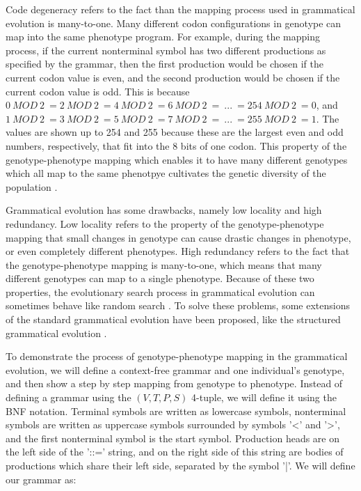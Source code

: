 Code degeneracy refers to the fact than the mapping process used in grammatical evolution is many-to-one. Many different codon configurations in genotype can map into the same phenotype program. For example, during the mapping process, if the current nonterminal symbol has two different productions as specified by the grammar, then the first production would be chosen if the current codon value is even, and the second production would be chosen if the current codon value is odd. This is because $0\:MOD\:2\:=2\:MOD\:2\:=4\:MOD\:2\:=6\:MOD\:2\:=\:...\:=254\:MOD\:2\:=0$, and $1\:MOD\:2\:=3\:MOD\:2\:=5\:MOD\:2\:=7\:MOD\:2\:=\:...\:=255\:MOD\:2\:=1$. The values are shown up to 254 and 255 because these are the largest even and odd numbers, respectively, that fit into the 8 bits of one codon. This property of the genotype-phenotype mapping which enables it to have many different genotypes which all map to the same phenotpye cultivates the genetic diversity of the population \citep{neill2003grammaticalevolution}.

Grammatical evolution has some drawbacks, namely low locality and high redundancy. Low locality refers to the property of the genotype-phenotype mapping that small changes in genotype can cause drastic changes in phenotype, or even completely different phenotypes. High redundancy refers to the fact that the genotype-phenotype mapping is many-to-one, which means that many different genotypes can map to a single phenotype. Because of these two properties, the evolutionary search process in grammatical evolution can sometimes behave like random search \citep{megane2022coevolutionary}. To solve these problems, some extensions of the standard grammatical evolution have been proposed, like the structured grammatical evolution \citep{lourenco2018structured}.

To demonstrate the process of genotype-phenotype mapping in the grammatical evolution, we will define a context-free grammar and one individual's genotype, and then show a step by step mapping from genotype to phenotype. Instead of defining a grammar using the $(V, T, P, S)$ 4-tuple, we will define it using the BNF notation. Terminal symbols are written as lowercase symbols, nonterminal symbols are written as uppercase symbols surrounded by symbols '<' and '>', and the first nonterminal symbol is the start symbol. Production heads are on the left side of the '::=' string, and on the right side of this string are bodies of productions which share their left side, separated by the symbol '|'. We will define our grammar as:

